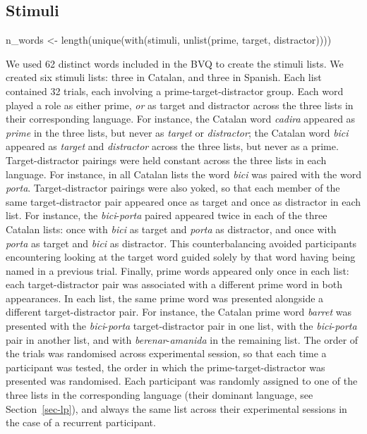 \documentclass[
  letterpaper,
  DIV=11,
  numbers=noendperiod]{scrartcl}
\newenvironment{Shaded}{\begin{snugshade}}{\end{snugshade}}
\newcommand{\FunctionTok}[1]{\textcolor[rgb]{0.28,0.35,0.67}{#1}}
\newcommand{\NormalTok}[1]{\textcolor[rgb]{0.00,0.23,0.31}{#1}}
\newcommand{\OtherTok}[1]{\textcolor[rgb]{0.00,0.23,0.31}{#1}}
\begin{document}
\hypertarget{stimuli}{%
\subsection{Stimuli}\label{stimuli}}

\begin{Shaded}
\begin{Highlighting}[]
\NormalTok{n\_words }\OtherTok{\textless{}{-}} \FunctionTok{length}\NormalTok{(}\FunctionTok{unique}\NormalTok{(}\FunctionTok{with}\NormalTok{(stimuli, }\FunctionTok{unlist}\NormalTok{(prime, target, distractor))))}
\end{Highlighting}
\end{Shaded}

We used 62 distinct words included in the BVQ to create the stimuli
lists. We created six stimuli lists: three in Catalan, and three in
Spanish. Each list contained 32 trials, each involving a
prime-target-distractor group. Each word played a role as either prime,
\emph{or} as target and distractor across the three lists in their
corresponding language. For instance, the Catalan word \emph{cadira}
appeared as \emph{prime} in the three lists, but never as \emph{target}
or \emph{distractor}; the Catalan word \emph{bici} appeared as
\emph{target} and \emph{distractor} across the three lists, but never as
a prime. Target-distractor pairings were held constant across the three
lists in each language. For instance, in all Catalan lists the word
\emph{bici} was paired with the word \emph{porta}. Target-distractor
pairings were also yoked, so that each member of the same
target-distractor pair appeared once as target and once as distractor in
each list. For instance, the \emph{bici}-\emph{porta} paired appeared
twice in each of the three Catalan lists: once with \emph{bici} as
target and \emph{porta} as distractor, and once with \emph{porta} as
target and \emph{bici} as distractor. This counterbalancing avoided
participants encountering looking at the target word guided solely by
that word having being named in a previous trial. Finally, prime words
appeared only once in each list: each target-distractor pair was
associated with a different prime word in both appearances. In each
list, the same prime word was presented alongside a different
target-distractor pair. For instance, the Catalan prime word
\emph{barret} was presented with the \emph{bici}-\emph{porta}
target-distractor pair in one list, with the \emph{bici}-\emph{porta}
pair in another list, and with \emph{berenar}-\emph{amanida} in the
remaining list. The order of the trials was randomised across
experimental session, so that each time a participant was tested, the
order in which the prime-target-distractor was presented was randomised.
Each participant was randomly assigned to one of the three lists in the
corresponding language (their dominant language, see
Section~\ref{sec-lp}), and always the same list across their
experimental sessions in the case of a recurrent participant.
\end{document}

